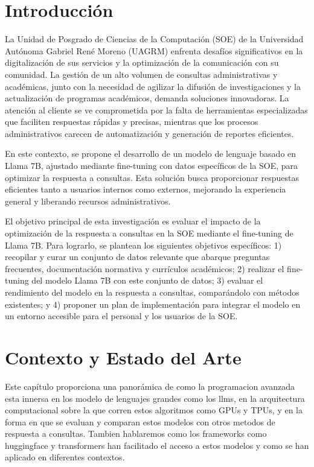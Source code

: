 \documentclass[12pt,twocolumn]{article}
\begin{document}

\section{Introducción}
La Unidad de Posgrado de Ciencias de la Computación (SOE) de la Universidad Autónoma Gabriel René Moreno (UAGRM) enfrenta desafíos significativos en la digitalización de sus servicios y la optimización de la comunicación con su comunidad. 
La gestión de un alto volumen de consultas administrativas y académicas, junto con la necesidad de agilizar la difusión de investigaciones y la actualización de programas académicos, demanda soluciones innovadoras. 
La atención al cliente se ve comprometida por la falta de herramientas especializadas que faciliten respuestas rápidas y precisas, mientras que los procesos administrativos carecen de automatización y generación de reportes eficientes.

En este contexto, se propone el desarrollo de un modelo de lenguaje basado en Llama 7B, ajustado mediante fine-tuning con datos específicos de la SOE, para optimizar la respuesta a consultas. 
Esta solución busca proporcionar respuestas eficientes tanto a usuarios internos como externos, mejorando la experiencia general y liberando recursos administrativos.

El objetivo principal de esta investigación es evaluar el impacto de la optimización de la respuesta a consultas en la SOE mediante el fine-tuning de Llama 7B. 
Para lograrlo, se plantean los siguientes objetivos específicos: 
1) recopilar y curar un conjunto de datos relevante que abarque preguntas frecuentes, documentación normativa y currículos académicos; 
2) realizar el fine-tuning del modelo Llama 7B con este conjunto de datos; 
3) evaluar el rendimiento del modelo en la respuesta a consultas, comparándolo con métodos existentes; y 
4) proponer un plan de implementación para integrar el modelo en un entorno accesible para el personal y los usuarios de la SOE.

\section{Contexto y Estado del Arte}
Este capítulo proporciona una panorámica de como la programacion avanzada esta innersa en los modelo de lenguajes grandes como los llms, en la arquitectura computacional sobre la que corren estos algoritmos como GPUs y TPUs, y en la forma en que se evaluan y comparan estos modelos con otros metodos de respuesta a consultas.
Tambien hablaremos como los frameworks como huggingface y transformers han facilitado el acceso a estos modelos y como se han aplicado en diferentes contextos.
\end{document}
